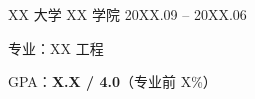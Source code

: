 \documentclass[11pt, a4paper, job]{dualcv}
\begin{document}
\makecvheader[R]


%
%


\begin{cventries}
  \cveducation
    {XX 大学}
    {XX 学院}
    {20XX.09 -- 20XX.06}
    {
      \begin{cvitems}
        \item 专业：XX 工程
        \item GPA：\textbf{X.X / 4.0}（专业前 X\%）
      \end{cvitems}
    }
\end{cventries}
\end{document}
